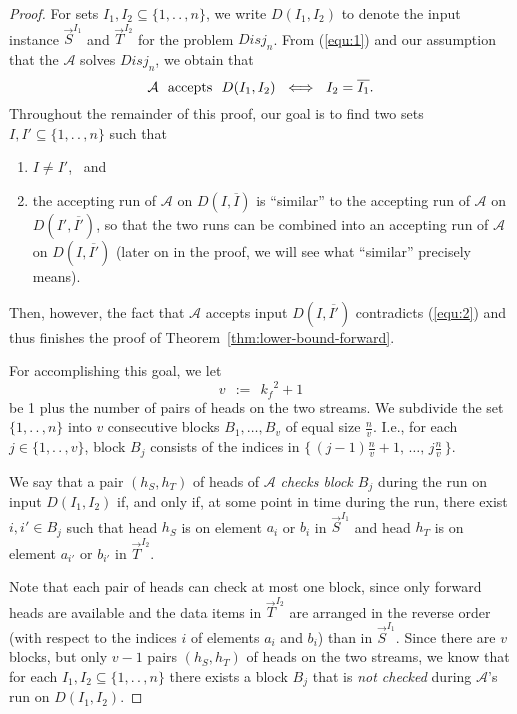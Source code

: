 \documentclass[proceedings]{stacs}
\theoremstyle{plain}\newtheorem{satz}[thm]{Satz}
\theoremstyle{definition}\newtheorem{crucial}[thm]{Crucial Definition}
\newcommand{\ov}[1]{\overline{#1}}
\newcommand{\vek}[1]{\vec{#1}}
\newcommand{\twodots}{.\,.\,}
\newcommand{\set}[1]{\ensuremath{\{ #1 \}}}
\newcommand*{\A}{\ensuremath{\mathcal{A}}}
\newcommand{\Disj}{\ensuremath{\textit{Disj}}}
\newcommand{\aut}{\text{mp2s-automaton}}
\newcommand{\kf}{\ensuremath{k_{\scriptscriptstyle f}}}
\newcommand{\vv}{\ensuremath{v}}
\begin{document}
\begin{proof}
For sets $I_1,I_2\subseteq \set{1,\twodots,n}$, we write $D(I_1,I_2)$ to denote the input instance
$\vek{S}^{I_1}$ and $\vek{T}^{I_2}$ for the problem $\Disj_n$.
From (\ref{equ:1}) and our assumption that the \aut{} $\A$ solves $\Disj_n$, we obtain 
that 
\begin{equation}\label{equ:2}
  \A \text{ \ accepts \ } D(I_1,I_2) \ \iff \ I_2 = \ov{I_1}. \vspace{1ex}
\end{equation}
Throughout the remainder of this proof, our goal is to find two sets
$I,I'\subseteq \set{1,\twodots,n}$ such that \vspace{1ex}
\begin{enumerate}
 \item
   $I\neq I'$, \ and \vspace{1ex}
 \item
   the accepting run of $\A$ on $D(I,\ov{I})$ is ``similar'' to the
   accepting run of $\A$ on $D(I', \ov{I'})$, so that the two runs can be combined into
   an accepting run of $\A$ on $D(I,\ov{I'})$ (later on in the proof, we will see
   what ``similar'' precisely means).
  \vspace{1ex}
\end{enumerate}
Then, however,
the fact that $\A$ accepts input $D(I,\ov{I'})$ contradicts (\ref{equ:2}) and thus
finishes the proof of Theorem~\ref{thm:lower-bound-forward}.

For accomplishing this goal, we let 
\begin{equation}\label{eq:def-v}
  \vv \ \ := \ \ \kf^2 +1
\end{equation}
be 1 plus the number of pairs of heads on the two streams. We subdivide the set
$\set{1,\twodots,n}$ into $\vv$ consecutive blocks $B_1,\ldots, B_{\vv}$ of equal size 
$\frac{n}{\vv}$. I.e., for each $j\in\set{1,\twodots,\vv}$, block $B_j$ consists of the
indices in $\set{\, (j{-}1) \frac{n}{\vv} + 1, \,\ldots, \, j \frac{n}{\vv}\,}$.

We say that a pair $(h_S,h_T)$ of heads of $\A$ \emph{checks block $B_j$} during the run
on input $D(I_1,I_2)$
if, and only if, at some point in time during the run, there exist
$i,i'\in B_j$ such that head $h_S$ is on element
$a_i$ or $b_i$ in $\vek{S}^{I_1}$ and head $h_T$ is on element
$a_{i'}$ or $b_{i'}$ in $\vek{T}^{I_2}$.

Note that each pair of heads can check at most one block, since only forward heads
are available and the data items in $\vek{T}^{I_2}$ are arranged in the reverse
order (with respect to the indices $i$ of elements $a_i$ and $b_i$) than in $\vek{S}^{I_1}$.
Since there are $\vv$ blocks, but only $\vv-1$ pairs $(h_S,h_T)$ of heads on the
two streams, we know that for each $I_1,I_2\subseteq \set{1,\twodots,n}$ there exists
a block $B_j$ that is \emph{not checked} during $\A$'s run on $D(I_1,I_2)$.


\end{proof}
\end{document}
